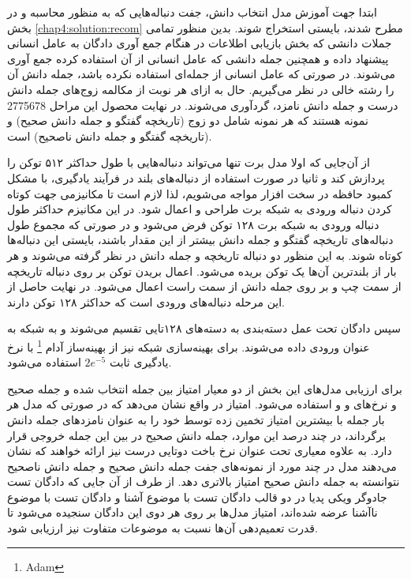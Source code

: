  ابتدا جهت آموزش مدل انتخاب دانش،‌ جفت دنباله‌هایی که به منظور محاسبه 
 و
 در بخش 
 \ref{chap4:solution:recom}
 مطرح شدند، بایستی استخراج شوند. بدین منظور تمامی جملات دانشی که بخش بازیابی اطلاعات در هنگام جمع آوری دادگان به عامل انسانی پیشنهاد داده و همچنین جمله دانشی که عامل انسانی از آن استفاده کرده جمع آوری می‌شوند. در صورتی که عامل انسانی از جمله‌ای استفاده نکرده باشد،‌ جمله دانش آن را رشته خالی در نظر می‌گیریم. حال به ازای هر نوبت از مکالمه زوج‌های جمله دانش درست و جمله دانش نامزد، گردآوری می‌شوند. در نهایت محصول این مراحل 2775678 نمونه هستند که هر نمونه شامل دو زوج (تاریخچه گفتگو و جمله دانش صحیح) و (تاریخچه گفتگو و جمله دانش ناصحیح) است. 
 

از آن‌جایی که اولا مدل برت تنها می‌تواند دنباله‌هایی با طول حداکثر ۵۱۲ توکن را پردازش کند و ثانیا در صورت استفاده از دنباله‌های بلند در فرآیند یادگیری، با مشکل کمبود حافظه در سخت افزار مواجه می‌شویم، لذا لازم است تا مکانیزمی جهت کوتاه کردن دنباله ورودی به شبکه برت طراحی و اعمال شود. در این مکانیزم حداکثر طول دنباله ورودی به شبکه برت ۱۲۸ توکن فرض می‌شود و در صورتی که مجموع طول دنباله‌های تاریخچه گفتگو و جمله دانش بیشتر از این مقدار باشند، بایستی این دنباله‌ها کوتاه شوند. به این منظور دو دنباله تاریخچه و جمله دانش در نظر گرفته می‌شوند و هر بار از بلندترین آن‌ها یک توکن بریده می‌شود. اعمال بریدن توکن بر روی دنباله تاریخچه از سمت چپ و بر روی جمله دانش از سمت راست اعمال می‌شود. در نهایت حاصل از این مرحله دنباله‌های ورودی است که حداکثر ۱۲۸ توکن دارند. 

سپس دادگان تحت عمل دسته‌بندی به دسته‌های ۱۲۸تایی تقسیم می‌شوند و به شبکه به عنوان ورودی داده می‌شوند. برای بهینه‌سازی شبکه نیز از بهینه‌ساز آدام
\footnote{Adam}
با نرخ یادگیری ثابت 
$2e^{-5}$
استفاده می‌شود.

برای ارزیابی مدل‌های این بخش از دو معیار امتیاز
بین جمله انتخاب شده و جمله صحیح
و نرخ‌های 
 و  و 
استفاده می‌شود. امتیاز
در واقع نشان می‌دهد که در صورتی که مدل هر بار 
جمله  با بیشترین امتیاز تخمین زده توسط خود را به عنوان نامزد‌های جمله دانش برگرداند، در چند درصد این موارد، جمله دانش صحیح در بین این 
جمله خروجی قرار دارد. 
به علاوه معیاری تحت عنوان نرخ باخت دوتایی درست نیز ارائه خواهند که نشان می‌دهند مدل در چند مورد از نمونه‌های جفت جمله دانش صحیح و جمله دانش ناصحیح نتوانسته به جمله دانش صحیح امتیاز بالاتری دهد. 
از طرف از آن‌ جایی که دادگان تست جادوگر ویکی پدیا در دو قالب دادگان تست با موضوع آشنا و دادگان تست با موضوع ناآشنا عرضه شده‌اند، امتیاز مدل‌ها بر روی هر دوی این دادگان سنجیده می‌شود تا قدرت تعمیم‌دهی آن‌ها نسبت به موضوعات متفاوت نیز ارزیابی شود.  

